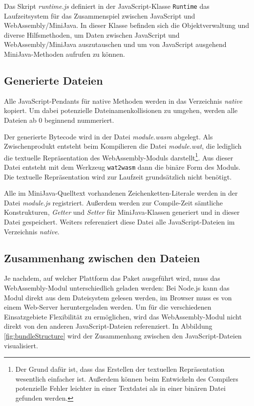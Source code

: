Das Skript \emph{runtime.js} definiert in der JavaScript-Klasse \lstinline{Runtime} das Laufzeitsystem für das Zusammenspiel zwischen JavaScript und WebAssembly/MiniJava. In dieser Klasse befinden sich die Objektverwaltung und diverse Hilfsmethoden, um Daten zwischen JavaScript und WebAssembly/MiniJava auszutauschen und um von JavaScript ausgehend MiniJava-Methoden aufrufen zu können.

\subsection{Generierte Dateien}

Alle JavaScript-Pendants für native Methoden werden in das Verzeichnis \emph{native} kopiert. Um dabei potenzielle Dateinamenkollisionen zu umgehen, werden alle Dateien ab 0 beginnend nummeriert.

Der generierte Bytecode wird in der Datei \emph{module.wasm} abgelegt. Als Zwischenprodukt entsteht beim Kompilieren die Datei \emph{module.wat}, die lediglich die textuelle Repräsentation des WebAssembly-Moduls darstellt\footnote{Der Grund dafür ist, dass das Erstellen der textuellen Repräsentation wesentlich einfacher ist. Außerdem können beim Entwickeln des Compilers potenzielle Fehler leichter in einer Textdatei als in einer binären Datei gefunden werden.}. Aus dieser Datei entsteht mit dem Werkzeug \lstinline{wat2wasm} \cite{WABT} dann die binäre Form des Moduls. Die textuelle Repräsentation wird zur Laufzeit grundsätzlich nicht benötigt.

Alle im MiniJava-Quelltext vorhandenen Zeichenketten-Literale werden in der Datei \emph{module.js} registriert. Außerdem werden zur Compile-Zeit sämtliche Konstrukturen, \emph{Getter} und \emph{Setter} für MiniJava-Klassen generiert und in dieser Datei gespeichert. Weiters referenziert diese Datei alle JavaScript-Dateien im Verzeichnis \emph{native}.

\subsection{Zusammenhang zwischen den Dateien}

Je nachdem, auf welcher Plattform das Paket ausgeführt wird, muss das WebAssembly-Modul unterschiedlich geladen werden: Bei Node.js kann das Modul direkt aus dem Dateisystem gelesen werden, im Browser muss es von einem Web-Server heruntergeladen werden. Um für die verschiedenen Einsatzgebiete Flexibilität zu ermöglichen, wird das WebAssembly-Modul nicht direkt von den anderen JavaScript-Dateien referenziert. In Abbildung \ref{fig:bundleStructure} wird der Zusammenhang zwischen den JavaScript-Dateien visualisiert.

